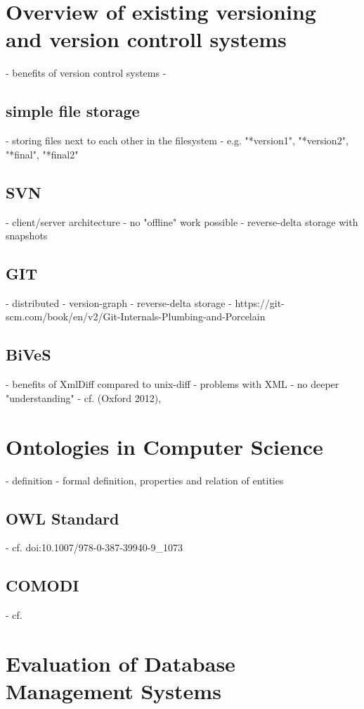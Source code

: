 \section{Overview of existing versioning and version controll systems}
- benefits of version control systems
	- \todo[elloborate]
	
	\subsection{simple file storage}
	- storing files next to each other in the filesystem
	- e.g. "*version1", "*version2", "*final", "*final2"
	
	\subsection{SVN}
	- client/server architecture
	- no "offline" work possible
	- reverse-delta storage with snapshots
	
	\subsection{GIT}
	- distributed
	- version-graph
	- reverse-delta storage
	- https://git-scm.com/book/en/v2/Git-Internals-Plumbing-and-Porcelain
	
	\subsection{BiVeS}
	- benefits of XmlDiff compared to unix-diff
		- problems with XML
		- no deeper "understanding"
	- cf. \cite{Waltemath2013} (Oxford 2012), \cite{Scharm2015}

\section{Ontologies in Computer Science}
- definition
	- formal definition, properties and relation of entities

	\subsection{OWL Standard}
	- cf. doi:10.1007/978-0-387-39940-9\_1073
	
	\subsection{COMODI}
	- cf. \cite{Scharm2016}
	
\section{Evaluation of Database Management Systems}

